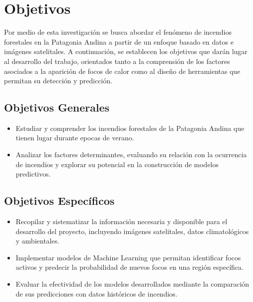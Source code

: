 \section{Objetivos}
Por medio de esta investigación se busca abordar el fenómeno de incendios forestales en la Patagonia Andina a partir de un enfoque basado en datos e imágenes satelitales. A continuación, se establecen los objetivos que darán lugar al desarrollo del trabajo, orientados tanto a la comprensión de los factores asociados a la aparición de focos de calor como al diseño de herramientas que permitan su detección y predicción.

\subsection{Objetivos Generales}
\begin{itemize}
    \item Estudiar y comprender los incendios forestales de la Patagonia Andina que tienen lugar durante epocas de verano.
    \item Analizar los factores determinantes, evaluando su relación con la ocurrencia de incendios y explorar su potencial en la construcción de modelos predictivos.
\end{itemize}

\subsection{Objetivos Específicos}
\begin{itemize}
    \item Recopilar y sistematizar la información necesaria y disponible para el desarrollo del proyecto, incluyendo imágenes satelitales, datos climatológicos y ambientales.
    \item Implementar modelos de Machine Learning que permitan identificar focos activos y predecir la probabilidad de nuevos focos en una región específica.
    \item Evaluar la efectividad de los modelos desarrollados mediante la comparación de sus predicciones con datos históricos de incendios.
\end{itemize}